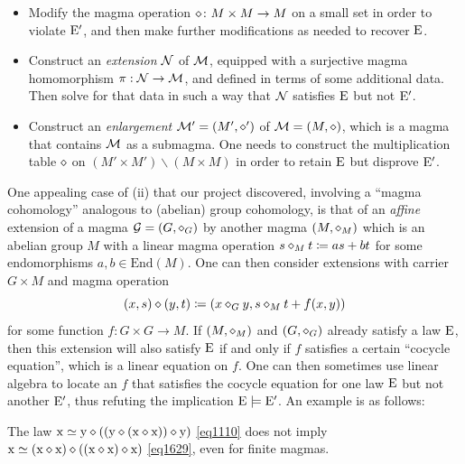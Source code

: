 \begin{itemize}
  \item[(i)]  Modify the magma operation $\diamond \colon M \times M \to M$ on a small set in order to violate ${\mathrm{E}'}$, and then make further modifications as needed to recover $\mathrm{E}$.
  \item[(ii)]  Construct an \emph{extension} ${\mathcal{N}}$ of ${\mathcal{M}}$, equipped with a surjective magma homomorphism $\pi: {\mathcal{N}} \to {\mathcal{M}}$, and defined in terms of some additional data.  Then solve for that data in such a way that ${\mathcal{N}}$ satisfies $\mathrm{E}$ but not ${\mathrm{E}'}$.
  \item[(iii)]  Construct an \emph{enlargement} ${\mathcal{M}}' = (M',\diamond')$ of ${\mathcal{M}} = (M,\diamond)$, which is a magma that contains ${\mathcal{M}}$ as a submagma.  One needs to construct the multiplication table $\diamond$ on $(M' \times M') \backslash (M \times M)$ in order to retain $\mathrm{E}$ but disprove ${\mathrm{E}'}$.
\end{itemize}

One appealing case of (ii) that our project discovered, involving a ``magma cohomology'' analogous to (abelian) group cohomology, is that of an \emph{affine} extension of a magma ${\mathcal G} = (G,\diamond_G)$ by another magma $(M,\diamond_M)$ which is an abelian group $M$ with a linear magma operation $s \diamond_M t \coloneqq as + bt$ for some endomorphisms $a,b \in \mathrm{End}(M)$.  One can then consider extensions with carrier $G \times M$ and magma operation
\begin{equation}\label{xsyt}
 (x, s) \diamond (y, t) \coloneqq (x \diamond_G y, s \diamond_M t + f(x,y))
\end{equation}
for some function $f \colon G \times G \to M$.  If $(M,\diamond_M)$ and $(G,\diamond_G)$ already satisfy a law $\mathrm{E}$, then this extension will also satisfy $\mathrm{E}$ if and only if $f$ satisfies a certain ``cocycle equation'', which is a linear equation on $f$.  One can then sometimes use linear algebra to locate an $f$ that satisfies the cocycle equation for one law $\mathrm{E}$ but not another ${\mathrm{E}'}$, thus refuting the implication $\mathrm{E} \models {\mathrm{E}'}$.  An example is as follows:

\begin{proposition}[$\Eq{1110} \nmodels \Eq{1629}$]\label{1110-1629} The law $\mathrm{x} \simeq \mathrm{y} \diamond ((\mathrm{y} \diamond (\mathrm{x} \diamond \mathrm{x})) \diamond \mathrm{y})$ \eqref{eq1110} does not imply $\mathrm{x} \simeq (\mathrm{x} \diamond \mathrm{x}) \diamond ((\mathrm{x} \diamond \mathrm{x}) \diamond \mathrm{x})$ \eqref{eq1629}, even for finite magmas.
\end{proposition}

